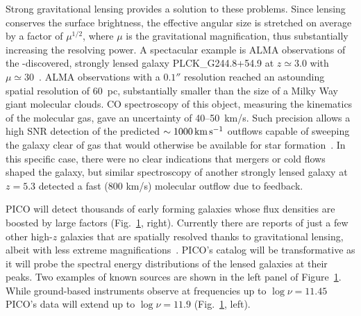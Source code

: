 \documentclass[PICOReport.tex]{subfiles}
\begin{document}
\begin{figure}[h]
\begin{center}
\label{fig:SED3}
\end{center}
\vspace{-0.15in}
\end{figure}

Strong gravitational lensing provides a solution to these problems. Since lensing conserves the surface brightness, the effective angular size is stretched on average by a factor of $\mu^{1/2}$, where $\mu$ is the gravitational magnification, thus substantially increasing the resolving power. A spectacular example is ALMA observations of the \planck-discovered, strongly lensed galaxy PLCK\_G244.8\-+54.9 at $z \simeq 3.0$  with $\mu \simeq 30$~\citep{Canameras2017ALMA}. ALMA observations with a $0.1''$ resolution reached an astounding spatial resolution of 60~pc, substantially smaller than the size of a Milky Way giant molecular clouds. CO spectroscopy of this object, measuring the kinematics of the molecular gas, gave an uncertainty of 40--50~km/s. Such precision allows a high \ac{SNR} detection of the predicted $\sim 1000\,\hbox{km}\,\hbox{s}^{-1}$  outflows capable of sweeping the galaxy clear of gas that would otherwise be available for star formation~\citep{KingPounds2015}. In this specific case, there were no clear indications that mergers or cold flows shaped the galaxy, but similar spectroscopy of another strongly lensed galaxy at $z=5.3$ detected a fast (800 km/s) molecular outflow due to feedback. 

PICO will detect thousands of early forming galaxies whose flux densities are boosted by large factors (Fig.~\ref{fig:SED3}, right).
Currently there are reports of just a few other high-$z$ galaxies that are spatially resolved thanks to gravitational lensing, albeit with less extreme magnifications~\citep{Dye2018, Lamarche2018, Sharda2018}. PICO's catalog will be transformative as it will probe the spectral energy distributions of the lensed galaxies at their peaks. Two examples of known sources are shown in the left panel of Figure~\ref{fig:SED3}. While ground-based instruments observe at frequencies up to $\log \nu = 11.45$ PICO's data will extend up to $\log \nu = 11.9$ (Fig.~\ref{fig:SED3}, left).
\end{document}
